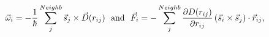 \documentclass[preview]{standalone}
\begin{document}
\begin{varwidth}{50in}
  \begin{equation}
    \vec{\omega}_i = -\frac{1}{\hbar} \sum_{j}^{Neighb} \vec{s}_{j}\times\vec{D}(r_{ij}) ~~{\rm and}~~
    \vec{F}_i = -\sum_{j}^{Neighb} \frac{\partial D(r_{ij})}{\partial r_{ij}} \left(\vec{s}_{i}\times \vec{s}_{j} \right) \cdot \vec{r}_{ij}, \nonumber
  \end{equation}
\end{varwidth}
\end{document}
